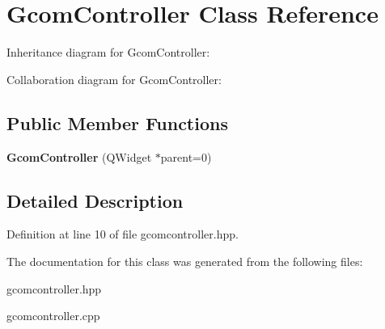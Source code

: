 \hypertarget{class_gcom_controller}{}\section{Gcom\+Controller Class Reference}
\label{class_gcom_controller}


Inheritance diagram for Gcom\+Controller\+:


Collaboration diagram for Gcom\+Controller\+:
\subsection*{Public Member Functions}
\begin{DoxyCompactItemize}
\item 
\hypertarget{class_gcom_controller_a8df3819a90e042fe5ee28fd85f0761ee}{}\label{class_gcom_controller_a8df3819a90e042fe5ee28fd85f0761ee} 
{\bfseries Gcom\+Controller} (Q\+Widget $\ast$parent=0)
\end{DoxyCompactItemize}


\subsection{Detailed Description}


Definition at line 10 of file gcomcontroller.\+hpp.



The documentation for this class was generated from the following files\+:\begin{DoxyCompactItemize}
\item 
gcomcontroller.\+hpp\item 
gcomcontroller.\+cpp\end{DoxyCompactItemize}
